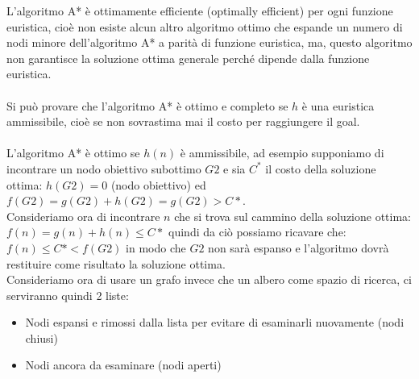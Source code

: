 \documentclass[../main.tex]{subfiles}
\begin{document}
	L'algoritmo A* è ottimamente efficiente (optimally efficient) per ogni funzione euristica, cioè non esiste alcun altro algoritmo ottimo che espande un numero di nodi minore dell'algoritmo A* a parità di funzione euristica, ma, questo algoritmo non garantisce la soluzione ottima generale perché dipende dalla funzione euristica.\\ \\
	Si può provare che l'algoritmo A* è ottimo e completo se $h$ è una euristica ammissibile, cioè se non sovrastima mai il costo per raggiungere il goal. \\ \\
	L'algoritmo A* è ottimo se $h(n)$ è ammissibile, ad esempio supponiamo di incontrare un nodo obiettivo subottimo $G2$ e sia $C^*$ il costo della soluzione ottima: $h(G2)=0$ (nodo obiettivo) ed $f(G2)= g(G2)+h(G2)= g(G2)> C*$.\\
	Consideriamo ora di incontrare $n$ che si trova sul cammino della soluzione ottima: $f(n)= g(n)+h(n) \leq C*$ quindi da ciò possiamo ricavare che: $f(n) \leq C*< f(G2)$ in modo che $G2$ non sarà espanso e l'algoritmo dovrà restituire come risultato la soluzione ottima.\\
	Consideriamo ora di usare un grafo invece che un albero come spazio di ricerca, ci serviranno quindi 2 liste:
	\begin{itemize}
		\item Nodi espansi e rimossi dalla lista per evitare di esaminarli nuovamente (nodi chiusi)
		\item Nodi ancora da esaminare (nodi aperti)
	\end{itemize}
\end{document}
